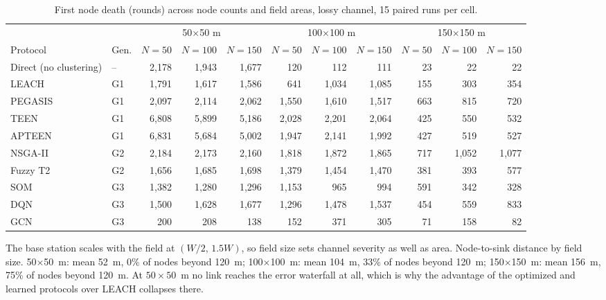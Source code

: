 \begin{table}[!t]
\caption{First node death (rounds) across node counts and field areas, lossy channel, 15 paired runs per cell.}
\label{tab:scale-fnd}
\centering
\begin{tabular}{llrrrrrrrrr}
\toprule
  &   & \multicolumn{3}{c}{50$\times$50 m} & \multicolumn{3}{c}{100$\times$100 m} & \multicolumn{3}{c}{150$\times$150 m} \\
\cmidrule(lr){3-5}\cmidrule(lr){6-8}\cmidrule(lr){9-11}
Protocol & Gen. & $N{=}50$ & $N{=}100$ & $N{=}150$ & $N{=}50$ & $N{=}100$ & $N{=}150$ & $N{=}50$ & $N{=}100$ & $N{=}150$ \\
\midrule
Direct (no clustering) & -- & 2,178 & 1,943 & 1,677 & 120 & 112 & 111 & 23 & 22 & 22 \\
LEACH & G1 & 1,791 & 1,617 & 1,586 & 641 & 1,034 & 1,085 & 155 & 303 & 354 \\
PEGASIS & G1 & 2,097 & 2,114 & 2,062 & 1,550 & 1,610 & 1,517 & 663 & 815 & 720 \\
TEEN & G1 & 6,808 & 5,899 & 5,186 & 2,028 & 2,201 & 2,064 & 425 & 550 & 532 \\
APTEEN & G1 & 6,831 & 5,684 & 5,002 & 1,947 & 2,141 & 1,992 & 427 & 519 & 527 \\
NSGA-II & G2 & 2,184 & 2,173 & 2,160 & 1,818 & 1,872 & 1,865 & 717 & 1,052 & 1,077 \\
Fuzzy T2 & G2 & 1,656 & 1,685 & 1,698 & 1,379 & 1,454 & 1,470 & 381 & 393 & 577 \\
SOM & G3 & 1,382 & 1,280 & 1,296 & 1,153 & 965 & 994 & 591 & 342 & 328 \\
DQN & G3 & 1,500 & 1,628 & 1,677 & 1,296 & 1,478 & 1,537 & 454 & 559 & 833 \\
GCN & G3 & 200 & 208 & 138 & 152 & 371 & 305 & 71 & 158 & 82 \\
\bottomrule
\end{tabular}

{\footnotesize The base station scales with the field at $(W/2,\,1.5W)$, so field size sets channel severity as well as area. Node-to-sink distance by field size. 50$\times$50~m: mean 52~m, 0\% of nodes beyond 120~m; 100$\times$100~m: mean 104~m, 33\% of nodes beyond 120~m; 150$\times$150~m: mean 156~m, 75\% of nodes beyond 120~m. At $50\times50$~m no link reaches the error waterfall at all, which is why the advantage of the optimized and learned protocols over LEACH collapses there.\par}
\end{table}

